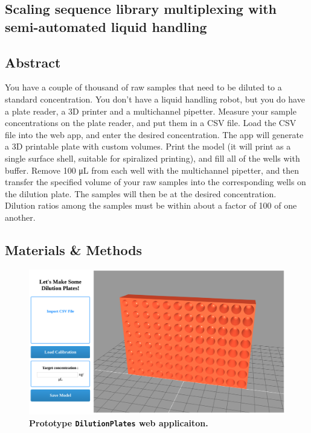 \begin{refsection}

\chapter{Scaling sequence library multiplexing with semi-automated liquid handling}


\section{Abstract}



You have a couple of thousand of raw samples that need to be diluted to a standard concentration. You don't have a liquid handling robot, but you do have a plate reader, a 3D printer and a multichannel pipetter. Measure your sample concentrations on the plate reader, and put them in a CSV file. Load the CSV file into the web app, and enter the desired concentration. The app will generate a 3D printable plate with custom volumes. Print the model (it will print as a single surface shell, suitable for spiralized printing), and fill all of the wells with buffer. Remove 100 \si{\micro\liter} from each well with the multichannel pipetter, and then transfer the specified volume of your raw samples into the corresponding wells on the dilution plate. The samples will then be at the desired concentration. Dilution ratios among the samples must be within about a factor of 100 of one another.

\section{Materials \& Methods}

\begin{figure}
    \centering
    \includegraphics[width=\textwidth]{DilutionPlates/figures/fig1}
    \caption{\textbf{Prototype {\tt DilutionPlates} web applicaiton.}}
    \label{DP_fig1}
\end{figure}


\end{refsection}
